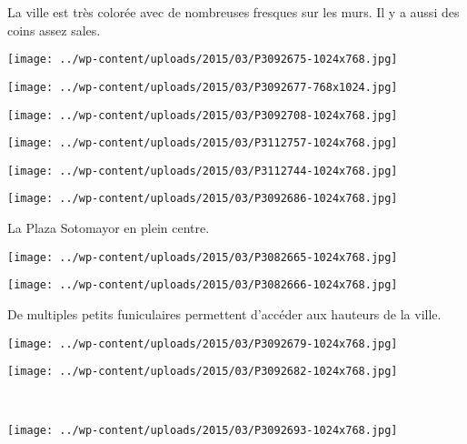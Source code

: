 La ville est très colorée avec de nombreuses fresques sur les murs. Il y a aussi des coins assez sales.
\begin{center} \texttt{[image: ../wp-content/uploads/2015/03/P3092675-1024x768.jpg]} \end{center}
\begin{center} \texttt{[image: ../wp-content/uploads/2015/03/P3092677-768x1024.jpg]} \end{center}
\begin{center} \texttt{[image: ../wp-content/uploads/2015/03/P3092708-1024x768.jpg]} \end{center}
\begin{center} \texttt{[image: ../wp-content/uploads/2015/03/P3112757-1024x768.jpg]} \end{center}
\begin{center} \texttt{[image: ../wp-content/uploads/2015/03/P3112744-1024x768.jpg]} \end{center}
\begin{center} \texttt{[image: ../wp-content/uploads/2015/03/P3092686-1024x768.jpg]} \end{center}

 La Plaza Sotomayor en plein centre.
\begin{center} \texttt{[image: ../wp-content/uploads/2015/03/P3082665-1024x768.jpg]} \end{center}
\begin{center} \texttt{[image: ../wp-content/uploads/2015/03/P3082666-1024x768.jpg]} \end{center}

 De multiples petits funiculaires permettent d'accéder aux hauteurs de la ville.
\begin{center} \texttt{[image: ../wp-content/uploads/2015/03/P3092679-1024x768.jpg]} \end{center}
\vspace{-\topsep}

\pagebreak
\begin{center} \texttt{[image: ../wp-content/uploads/2015/03/P3092682-1024x768.jpg]} \end{center}
~\\

\begin{center} \texttt{[image: ../wp-content/uploads/2015/03/P3092693-1024x768.jpg]} \end{center}
\vspace{-\topsep}
\vspace{-2.75mm}

